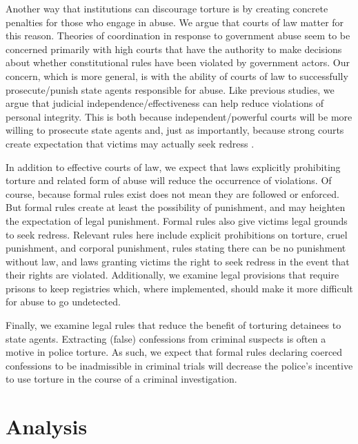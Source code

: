 \documentclass[12pt]{article}
\begin{document}
Another way that institutions can discourage torture is by creating concrete penalties for those who engage in abuse. We argue that courts of law matter for this reason. Theories of coordination in response to government abuse seem to be concerned primarily with high courts that have the authority to make decisions about whether constitutional rules have been violated by government actors. Our concern, which is more general, is with the ability of courts of law to successfully prosecute/punish state agents responsible for abuse. Like previous studies, we argue that judicial independence/effectiveness can help reduce violations of personal integrity. This is both because independent/powerful courts will be more willing to prosecute state agents and, just as importantly, because strong courts create expectation that victims may actually seek redress \citep{PowellStaton2009}. 

In addition to effective courts of law, we expect that laws explicitly prohibiting torture and related form of abuse will reduce the occurrence of violations. Of course, because formal rules exist does not mean they are followed or enforced. But formal rules create at least the possibility of punishment, and may heighten the expectation of legal punishment. Formal rules also give victims legal grounds to seek redress. Relevant rules here include explicit prohibitions on torture, cruel punishment, and corporal punishment, rules stating there can be no punishment without law, and laws granting victims the right to seek redress in the event that their rights are violated. Additionally, we examine legal provisions that require prisons to keep registries which, where implemented, should make it more difficult for abuse to go undetected. 

Finally, we examine legal rules that reduce the benefit of torturing detainees to state agents. Extracting (false) confessions from criminal suspects is often a motive in police torture. As such, we expect that formal rules declaring coerced confessions to be inadmissible in criminal trials will decrease the police's incentive to use torture in the course of a criminal investigation. 

\section*{Analysis}
\end{document}
